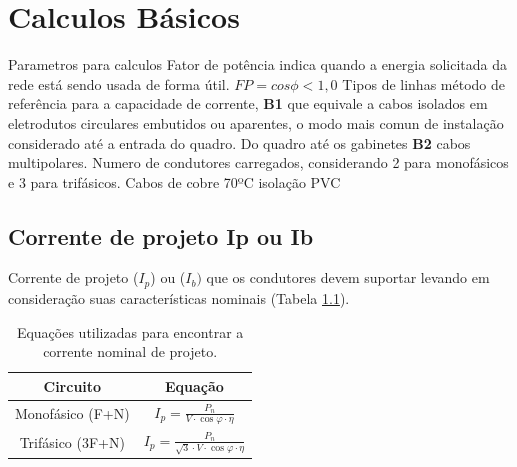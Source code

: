 \chapter{Calculos Básicos}
\label{cap:calculos}
Parametros para calculos
Fator de potência indica quando a energia solicitada da rede está sendo usada de forma útil. \textbf{$FP= cos \phi < 1,0$}
Tipos de linhas método de referência para a capacidade de corrente, \textbf{B1} que equivale a cabos isolados em eletrodutos circulares embutidos ou aparentes, o modo mais comun de instalação considerado até a entrada do quadro.
Do quadro até os gabinetes \textbf{ B2} cabos multipolares.
Numero de condutores carregados, considerando 2 para monofásicos e 3 para trifásicos.
Cabos de cobre 70ºC isolação PVC


\section{Corrente de projeto Ip ou Ib}
Corrente de projeto ($I_{p}$) ou ($I_{b})$ que os condutores devem suportar levando em consideração suas características nominais (Tabela \ref{tab:eqIp}).

\begin{table}[htbp]
\caption{Equações utilizadas para encontrar a corrente nominal de projeto.}
\begin{center}
\begin{tabular}{|c|c|}
\hline
Circuito & Equação \\ \hline
Monofásico (F+N) &\rule{0pt}{12pt} $I_{p}=\frac{P_{n}}{V \cdot \cos \varphi \cdot \eta}$ \rule[-6pt]{0pt}{0pt} \\ \hline
Trifásico (3F+N) & \rule{0pt}{12pt} $I_{p}=\frac{P_{n}}{\sqrt{3} \cdot V \cdot \cos \varphi \cdot \eta}$ \rule[-6pt]{0pt}{0pt} \\ \hline
\end{tabular}
\label{tab:eqIp}
\end{center}
\end{table}

